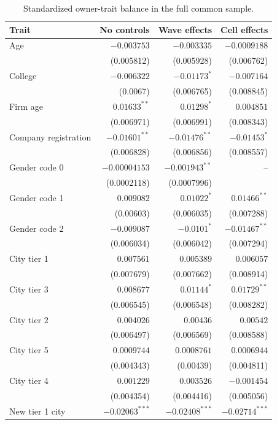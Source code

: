 \documentclass[11pt,letterpaper,english,final]{article}
\begin{document}
\begin{table}[H]
\centering\small
\setlength{\tabcolsep}{4pt}
\caption{Standardized owner-trait balance in the full common sample.}
\begin{tabular}{lrrr}
\toprule
Trait & No controls & Wave effects & Cell effects \\
\midrule
Age & $-0.003753$ & $-0.003335$ & $-0.0009188$ \\
 & (0.005812) & (0.005928) & (0.006762) \\[1pt]
College & $-0.006322$ & $-0.01173^{*}$ & $-0.007164$ \\
 & (0.0067) & (0.006765) & (0.008845) \\[1pt]
Firm age & $0.01633^{**}$ & $0.01298^{*}$ & $0.004851$ \\
 & (0.006971) & (0.006991) & (0.008343) \\[1pt]
Company registration & $-0.01601^{**}$ & $-0.01476^{**}$ & $-0.01453^{*}$ \\
 & (0.006828) & (0.006856) & (0.008557) \\[1pt]
Gender code 0 & $-0.00004153$ & $-0.001943^{**}$ & -- \\
 & (0.0002118) & (0.0007996) &  \\[1pt]
Gender code 1 & $0.009082$ & $0.01022^{*}$ & $0.01466^{**}$ \\
 & (0.00603) & (0.006035) & (0.007288) \\[1pt]
Gender code 2 & $-0.009087$ & $-0.0101^{*}$ & $-0.01467^{**}$ \\
 & (0.006034) & (0.006042) & (0.007294) \\[1pt]
City tier 1 & $0.007561$ & $0.005389$ & $0.006057$ \\
 & (0.007679) & (0.007662) & (0.008914) \\[1pt]
City tier 3 & $0.008677$ & $0.01144^{*}$ & $0.01729^{**}$ \\
 & (0.006545) & (0.006548) & (0.008282) \\[1pt]
City tier 2 & $0.004026$ & $0.00436$ & $0.00542$ \\
 & (0.006497) & (0.006569) & (0.008588) \\[1pt]
City tier 5 & $0.0009744$ & $0.0008761$ & $0.0006944$ \\
 & (0.004343) & (0.00439) & (0.004811) \\[1pt]
City tier 4 & $0.001229$ & $0.003526$ & $-0.001454$ \\
 & (0.004354) & (0.004416) & (0.005056) \\[1pt]
New tier 1 city & $-0.02063^{***}$ & $-0.02408^{***}$ & $-0.02714^{***}$ \\

\end{tabular}
\end{table}
\end{document}
